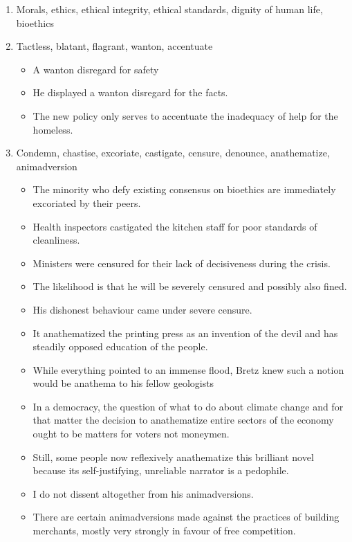 \documentclass[oneside]{book}
\begin{document}
  \begin{enumerate}
    \item Morals, ethics, ethical integrity, ethical standards, dignity of human life, bioethics
    \item Tactless, blatant, flagrant, wanton, accentuate
    \begin{itemize}
        \item A wanton disregard for safety
        \item He displayed a wanton disregard for the facts.
        \item The new policy only serves to accentuate the inadequacy of help for the homeless.
    \end{itemize}
    \item Condemn, chastise, excoriate, castigate, censure, denounce, anathematize, animadversion
    \begin{itemize}
        \item The minority who defy existing consensus on bioethics are immediately excoriated by their peers.
        \item Health inspectors castigated the kitchen staff for poor standards of cleanliness.  
        \item Ministers were censured for their lack of decisiveness during the crisis. 
        \item The likelihood is that he will be severely censured and possibly also fined.
        \item His dishonest behaviour came under severe censure.
        \item It anathematized the printing press as an invention of the devil and has steadily opposed education of the people.
        \item While everything pointed to an immense flood, Bretz knew such a notion would be anathema to his fellow geologists
        \item In a democracy, the question of what to do about climate change and for that matter the decision to anathematize entire sectors of the economy ought to be matters for voters not moneymen.
        \item Still, some people now reflexively anathematize this brilliant novel because its self-justifying, unreliable narrator is a pedophile.
        \item I do not dissent altogether from his animadversions.
        \item There are certain animadversions made against the practices of building merchants, mostly very strongly in favour of free competition.

\end{itemize}
\end{enumerate}
\end{document}
